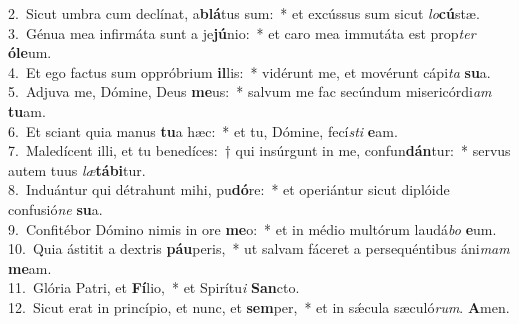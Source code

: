 {2.~}Sicut umbra cum declínat, a\textbf{blá}tus sum:~* et excússus sum sicut \textit{lo}\textbf{cú}stæ.\\
{3.~}Génua mea infirmáta sunt a je\textbf{jú}nio:~* et caro mea immutáta est prop\textit{ter} \textbf{ó}\textbf{le}um.\\
{4.~}Et ego factus sum oppróbrium \textbf{il}lis:~* vidérunt me, et movérunt cápi\textit{ta} \textbf{su}a.\\
{5.~}Adjuva me, Dómine, Deus \textbf{me}us:~* salvum me fac secúndum misericórdi\textit{am} \textbf{tu}am.\\
{6.~}Et sciant quia manus \textbf{tu}a hæc:~* et tu, Dómine, fecí\textit{sti} \textbf{e}am.\\
{7.~}Maledícent illi, et tu benedíces:~† qui insúrgunt in me, confun\textbf{dán}tur:~* servus autem tuus \textit{læ}\textbf{tá}\textbf{bi}tur.\\
{8.~}Induántur qui détrahunt mihi, pu\textbf{dó}re:~* et operiántur sicut diplóide confusió\textit{ne} \textbf{su}a.\\
{9.~}Confitébor Dómino nimis in ore \textbf{me}o:~* et in médio multórum laudá\textit{bo} \textbf{e}um.\\
{10.~}Quia ástitit a dextris \textbf{páu}peris,~* ut salvam fáceret a persequéntibus áni\textit{mam} \textbf{me}am.\\
{11.~}Glória Patri, et \textbf{Fí}lio,~* et Spirítu\textit{i} \textbf{San}cto.\\
{12.~}Sicut erat in princípio, et nunc, et \textbf{sem}per,~* et in sǽcula sæculó\textit{rum}. \textbf{A}men.\\
